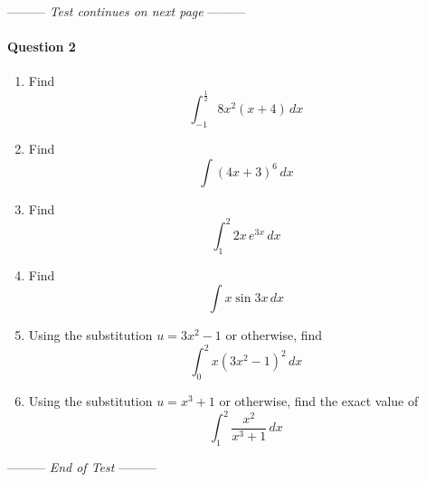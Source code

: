 \documentclass[a4paper,12pt,fleqn]{article}
\newcommand{\middlewords}{Test continues on next page}
\newcommand{\lastwords}{End of Test}
\begin{document}
\begin{center}
\vspace{3cm}
--------- \textit{\middlewords} ---------
\end{center}

\newpage
\paragraph{\textbf{Question 2}}

\begin{enumerate}[label=\alph*)]
\item Find \[\int^{\frac{1}{2}}_{-1}8x^2\left(x+4\right)\,dx\]
\item Find \[\int\left(4x+3\right)^6\,dx\]
\item Find \[\int^2_1 2x\,e^{3x}\,dx\]
\item Find \[\int x\sin3x\,dx\]
\item Using the substitution $u=3x^2-1$ or otherwise, find \[\int^2_0 x\left(3x^2-1\right)^2\,dx\]
\item Using the substitution $u=x^3+1$ or otherwise, find the exact value of \[\int^2_1 \dfrac{x^2}{x^3+1}\,dx\]
\end{enumerate}

\begin{center}
\vspace{3cm}
--------- \textit{\lastwords} ---------
\end{center}


\label{finalpage}

\begin{comment} %

\newpage
\paragraph{\textbf{Solutions} \ }

\paragraph{\textbf{Solutions to Question 1: }}
\begin{enumerate}[label=\alph*)]
\item sdfsdf
\end{enumerate}

\paragraph{\textbf{Solutions to Question 2: }}
\begin{enumerate}[label=\alph*)]
\item sdfsdf
\end{enumerate}


\end{comment}
\end{document}
